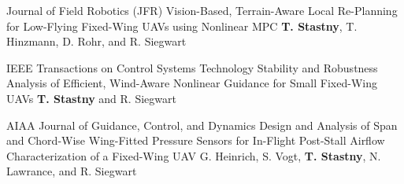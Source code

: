 \begin{cventries}
\begin{cvnumlist}
%
\item \cvpubentry
	{Journal of Field Robotics (JFR)} %
	{Vision-Based, Terrain-Aware Local Re-Planning for Low-Flying Fixed-Wing UAVs using Nonlinear MPC} %
	{\textbf{T. Stastny}, T. Hinzmann, D. Rohr, and R. Siegwart} %
	{} %
	{} %
	{} %
	{} %
%
\item \cvpubentry
	{IEEE Transactions on Control Systems Technology} %
	{Stability and Robustness Analysis of Efficient, Wind-Aware Nonlinear Guidance for Small Fixed-Wing UAVs} %
	{\textbf{T. Stastny} and R. Siegwart} %
	{} %
	{} %
	{} %
	{} %
%
\item \cvpubentry
	{AIAA Journal of Guidance, Control, and Dynamics} %
	{Design and Analysis of Span and Chord-Wise Wing-Fitted Pressure Sensors for In-Flight Post-Stall Airflow Characterization of a Fixed-Wing UAV} %
	{G. Heinrich, S. Vogt, \textbf{T. Stastny}, N. Lawrance, and R. Siegwart} %
	{} %
	{} %
	{} %
	{} %
%

\end{cvnumlist}
%



\end{cventries}
